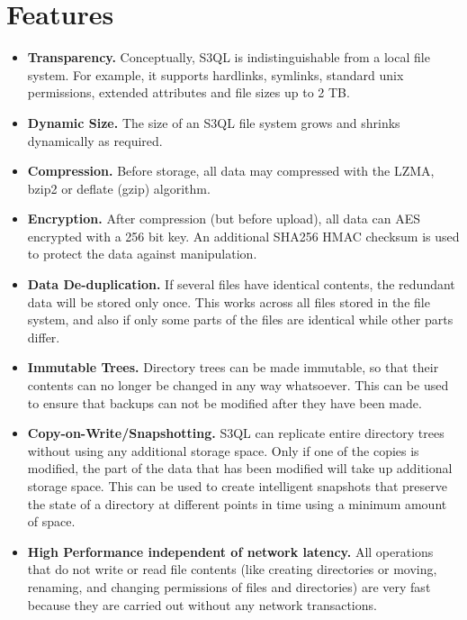 \documentclass[letterpaper,10pt,english]{sphinxmanual}
\begin{document}
\section{Features}
\label{about:features}\begin{itemize}
\item {} 
\textbf{Transparency.} Conceptually, S3QL is indistinguishable from a
local file system. For example, it supports hardlinks, symlinks,
standard unix permissions, extended attributes and file
sizes up to 2 TB.

\item {} 
\textbf{Dynamic Size.} The size of an S3QL file system grows and shrinks
dynamically as required.

\item {} 
\textbf{Compression.} Before storage, all data may compressed with the
LZMA, bzip2 or deflate (gzip) algorithm.

\item {} 
\textbf{Encryption.} After compression (but before upload), all data can
AES encrypted with a 256 bit key. An additional SHA256 HMAC checksum
is used to protect the data against manipulation.

\item {} 
\textbf{Data De-duplication.} If several files have identical contents,
the redundant data will be stored only once. This works across all
files stored in the file system, and also if only some parts of the
files are identical while other parts differ.

\item {} 
\textbf{Immutable Trees.} Directory trees can be made immutable, so that
their contents can no longer be changed in any way whatsoever. This
can be used to ensure that backups can not be modified after they
have been made.

\item {} 
\textbf{Copy-on-Write/Snapshotting.} S3QL can replicate entire directory
trees without using any additional storage space. Only if one of the
copies is modified, the part of the data that has been modified will
take up additional storage space. This can be used to create
intelligent snapshots that preserve the state of a directory at
different points in time using a minimum amount of space.

\item {} 
\textbf{High Performance independent of network latency.} All operations
that do not write or read file contents (like creating directories
or moving, renaming, and changing permissions of files and
directories) are very fast because they are carried out without any
network transactions.


\end{itemize}
\end{document}
